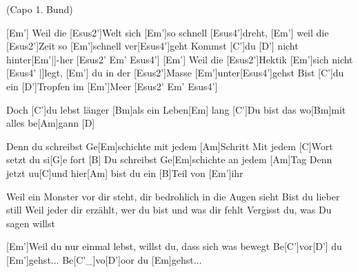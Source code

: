 
{\footnotesize(Capo 1. Bund)}

\begin{guitar}
	[Em'] Weil die [Esus2']Welt sich [Em']so schnell [Esus4']dreht, [Em'] weil die [Esus2']Zeit so [Em']schnell ver[Esus4']geht
	Kommst [C']du [D'] nicht hinter[Em'|]{-}her [Esus2' Em' Esus4']{}
	[Em'] Weil die [Esus2']Hektik [Em']sich nicht [Esus4' |]{legt,  }[Em'] du in der [Esus2']Masse [Em']unter[Esus4']gehst
	Bist [C']du ein [D']Tropfen im [Em']Meer [Esus2' Em' Esus4']{}
	
	Doch [C']du lebst länger [Bm]als ein Leben[Em] lang
	[C']Du bist das wo[Bm]mit alles be[Am]gann [D]{}
	
	Denn du schreibst Ge[Em]schichte mit jedem [Am]Schritt
	Mit jedem [C]Wort setzt du si[G]e fort [B]{}
	Du schreibst Ge[Em]schichte an jedem [Am]Tag
	Denn jetzt uu[C]und hier[Am] bist du ein [B]Teil von [Em']ihr
	
	Weil ein Monster vor dir steht, dir bedrohlich in die Augen sieht
	Bist du lieber still
	Weil jeder dir erzählt, wer du bist und was dir fehlt
	Vergisst du, was Du sagen willst
	
	 
	
	 
	
	[Em']Weil du nur einmal lebst, willst du, dass sich was bewegt
	Be[C']vor[D'] du [Em']gehst...
	Be[C'_]{vo}[D']oor du [Em]gehst...
	
	 
	
	 
\end{guitar}